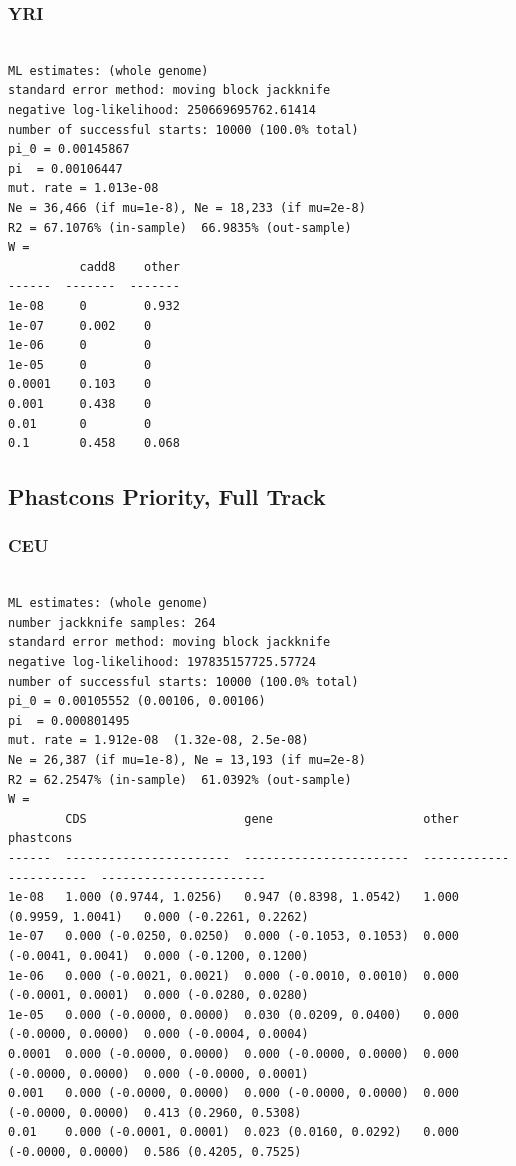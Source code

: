 \documentclass[11pt]{article}
\begin{document}
\subsubsection*{YRI}
\begin{minipage}{\linewidth}\begin{footnotesize}
\begin{verbatim}

ML estimates: (whole genome)
standard error method: moving block jackknife
negative log-likelihood: 250669695762.61414
number of successful starts: 10000 (100.0% total)
pi_0 = 0.00145867
pi  = 0.00106447
mut. rate = 1.013e-08 
Ne = 36,466 (if mu=1e-8), Ne = 18,233 (if mu=2e-8)
R2 = 67.1076% (in-sample)  66.9835% (out-sample)
W = 
          cadd8    other
------  -------  -------
1e-08     0        0.932
1e-07     0.002    0
1e-06     0        0
1e-05     0        0
0.0001    0.103    0
0.001     0.438    0
0.01      0        0
0.1       0.458    0.068
\end{verbatim}
\end{footnotesize}\end{minipage}


\subsection{Phastcons Priority, Full Track}
\subsubsection*{CEU}
\begin{minipage}{\linewidth}\begin{footnotesize}
\begin{verbatim}

ML estimates: (whole genome)
number jackknife samples: 264
standard error method: moving block jackknife
negative log-likelihood: 197835157725.57724
number of successful starts: 10000 (100.0% total)
pi_0 = 0.00105552 (0.00106, 0.00106)
pi  = 0.000801495
mut. rate = 1.912e-08  (1.32e-08, 2.5e-08)
Ne = 26,387 (if mu=1e-8), Ne = 13,193 (if mu=2e-8)
R2 = 62.2547% (in-sample)  61.0392% (out-sample)
W = 
        CDS                      gene                     other                    phastcons
------  -----------------------  -----------------------  -----------------------  -----------------------
1e-08   1.000 (0.9744, 1.0256)   0.947 (0.8398, 1.0542)   1.000 (0.9959, 1.0041)   0.000 (-0.2261, 0.2262)
1e-07   0.000 (-0.0250, 0.0250)  0.000 (-0.1053, 0.1053)  0.000 (-0.0041, 0.0041)  0.000 (-0.1200, 0.1200)
1e-06   0.000 (-0.0021, 0.0021)  0.000 (-0.0010, 0.0010)  0.000 (-0.0001, 0.0001)  0.000 (-0.0280, 0.0280)
1e-05   0.000 (-0.0000, 0.0000)  0.030 (0.0209, 0.0400)   0.000 (-0.0000, 0.0000)  0.000 (-0.0004, 0.0004)
0.0001  0.000 (-0.0000, 0.0000)  0.000 (-0.0000, 0.0000)  0.000 (-0.0000, 0.0000)  0.000 (-0.0000, 0.0001)
0.001   0.000 (-0.0000, 0.0000)  0.000 (-0.0000, 0.0000)  0.000 (-0.0000, 0.0000)  0.413 (0.2960, 0.5308)
0.01    0.000 (-0.0001, 0.0001)  0.023 (0.0160, 0.0292)   0.000 (-0.0000, 0.0000)  0.586 (0.4205, 0.7525)
\end{verbatim}
\end{footnotesize}\end{minipage}
\end{document}
